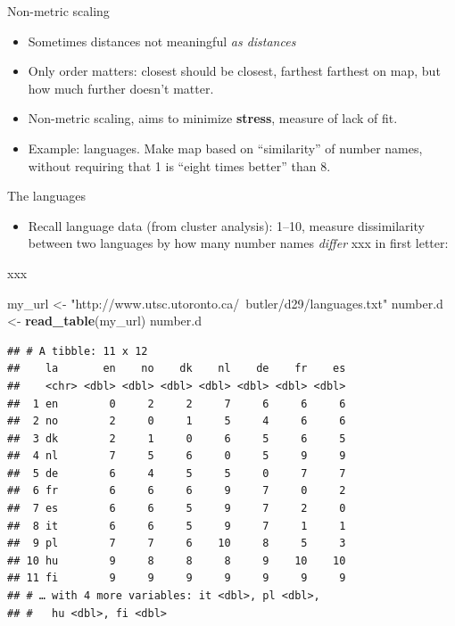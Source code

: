 \documentclass[ignorenonframetext,]{beamer}
\newenvironment{Shaded}{\begin{snugshade}}{\end{snugshade}}
\newcommand{\KeywordTok}[1]{\textcolor[rgb]{0.13,0.29,0.53}{\textbf{#1}}}
\newcommand{\NormalTok}[1]{#1}
\newcommand{\StringTok}[1]{\textcolor[rgb]{0.31,0.60,0.02}{#1}}
\providecommand{\tightlist}{%
  \setlength{\itemsep}{0pt}\setlength{\parskip}{0pt}}
\begin{document}
\begin{frame}{Non-metric scaling}
\protect\hypertarget{non-metric-scaling}{}

\begin{itemize}
\item
  Sometimes distances not meaningful \emph{as distances}
\item
  Only order matters: closest should be closest, farthest farthest on
  map, but how much further doesn't matter.
\item
  Non-metric scaling, aims to minimize \textbf{stress}, measure of lack
  of fit.
\item
  Example: languages. Make map based on ``similarity'' of number names,
  without requiring that 1 is ``eight times better'' than 8.
\end{itemize}

\end{frame}

\begin{frame}[fragile]{The languages}
\protect\hypertarget{the-languages}{}

\begin{itemize}
\tightlist
\item
  Recall language data (from cluster analysis): 1--10, measure
  dissimilarity between two languages by how many number names
  \emph{differ} xxx in first letter:
\end{itemize}

xxx

\scriptsize

\begin{Shaded}
\begin{Highlighting}[]
\NormalTok{my_url <-}\StringTok{ "http://www.utsc.utoronto.ca/~butler/d29/languages.txt"}
\NormalTok{number.d <-}\StringTok{ }\KeywordTok{read_table}\NormalTok{(my_url)}
\NormalTok{number.d}
\end{Highlighting}
\end{Shaded}

\begin{verbatim}
## # A tibble: 11 x 12
##    la       en    no    dk    nl    de    fr    es
##    <chr> <dbl> <dbl> <dbl> <dbl> <dbl> <dbl> <dbl>
##  1 en        0     2     2     7     6     6     6
##  2 no        2     0     1     5     4     6     6
##  3 dk        2     1     0     6     5     6     5
##  4 nl        7     5     6     0     5     9     9
##  5 de        6     4     5     5     0     7     7
##  6 fr        6     6     6     9     7     0     2
##  7 es        6     6     5     9     7     2     0
##  8 it        6     6     5     9     7     1     1
##  9 pl        7     7     6    10     8     5     3
## 10 hu        9     8     8     8     9    10    10
## 11 fi        9     9     9     9     9     9     9
## # … with 4 more variables: it <dbl>, pl <dbl>,
## #   hu <dbl>, fi <dbl>
\end{verbatim}

\normalsize

\end{frame}
\end{document}
